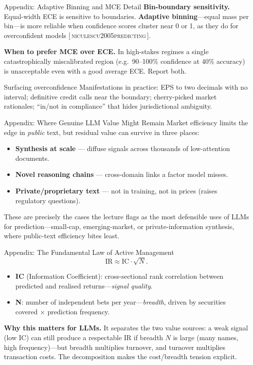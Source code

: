 \documentclass[9pt,t]{beamer}
\newcommand{\citesrc}[1]{\textsc{\small #1}}
\providecommand{\citep}[1]{{\footnotesize[\,\citesrc{#1}\,]}}
\begin{document}
\begin{frame}[noframenumbering]{Appendix: Adaptive Binning and MCE Detail}
\textbf{Bin-boundary sensitivity.} Equal-width ECE is sensitive to boundaries.
\textbf{Adaptive binning}---equal mass per bin---is more reliable when
confidence scores cluster near 0 or 1, as they do for overconfident models
\citep{niculescu2005predicting}.

\medskip
\textbf{When to prefer MCE over ECE.} In high-stakes regimes a single
catastrophically miscalibrated region (e.g.\ 90--100\% confidence at 40\%
accuracy) is unacceptable even with a good average ECE. Report both.

\medskip
\begin{block}{Surfacing overconfidence}
Manifestations in practice: EPS to two decimals with no interval; definitive
credit calls near the boundary; cherry-picked market rationales; ``in/not in
compliance'' that hides jurisdictional ambiguity.
\end{block}
\end{frame}

\begin{frame}[noframenumbering]{Appendix: Where Genuine LLM Value Might Remain}
Market efficiency limits the edge in \emph{public} text, but residual value can
survive in three places:
\begin{itemize}
  \item \textbf{Synthesis at scale} --- diffuse signals across thousands of
        low-attention documents.
  \item \textbf{Novel reasoning chains} --- cross-domain links a factor model misses.
  \item \textbf{Private/proprietary text} --- not in training, not in prices
        (raises regulatory questions).
\end{itemize}

\medskip
These are precisely the cases the lecture flags as the most defensible uses of
LLMs for prediction---small-cap, emerging-market, or private-information
synthesis, where public-text efficiency bites least.
\end{frame}

\begin{frame}[noframenumbering]{Appendix: The Fundamental Law of Active Management}
\[
  \text{IR} \approx \text{IC}\cdot\sqrt{N}.
\]
\begin{itemize}
  \item \textbf{IC} (Information Coefficient): cross-sectional rank correlation
        between predicted and realised returns---\emph{signal quality}.
  \item \textbf{N}: number of independent bets per year---\emph{breadth},
        driven by securities covered $\times$ prediction frequency.
\end{itemize}

\medskip
\textbf{Why this matters for LLMs.} It separates the two value sources: a weak
signal (low IC) can still produce a respectable IR if breadth $N$ is large
(many names, high frequency)---but breadth multiplies turnover, and turnover
multiplies transaction costs. The decomposition makes the cost/breadth tension
explicit.
\end{frame}
\end{document}
